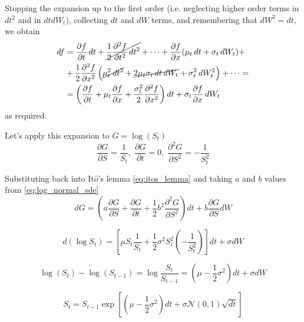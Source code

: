 \documentclass[12pt,a4paper]{article}
\begin{document}
Stopping the expansion up to the first order (i.e. neglecting higher order terms in $dt^2$ and in $dt dW_t$), collecting $dt$ and $dW$ terms, and remembering that $dW^2=dt$, we obtain
\begin{equation*}
\begin{aligned}
df&={\frac {\partial f}{\partial t}}\,dt+\cancel{{\frac {1}{2}}{\frac {\partial ^{2}f}{\partial t^{2}}}\,dt^{2}}+\cdots +{\frac {\partial f}{\partial x}}(\mu _{t}\,dt+\sigma _{t}\,dW_{t})+\\
&+{\frac {1}{2}}{\frac {\partial ^{2}f}{\partial x^{2}}}\left(\cancel{\mu _{t}^{2}\,dt^{2}}+\cancel{2\mu _{t}\sigma _{t}\,dt\,dW_{t}}+\sigma _{t}^{2}\,dW_{t}^{2}\right)+\cdots =\\
&=\left({\frac {\partial f}{\partial t}}+\mu _{t}{\frac {\partial f}{\partial x}}+{\frac {\sigma _{t}^{2}}{2}}{\frac {\partial ^{2}f}{\partial x^{2}}}\right)dt+\sigma _{t}{\frac {\partial f}{\partial x}}\,dW_{t}
\end{aligned}
\end{equation*}
as required.

Let's apply this expansion to $G=\log(S_t)$ 
\begin{equation*}
\frac{\partial G}{\partial S}=\frac{1}{S_t},\;\frac{\partial G}{\partial t}=0,\;\frac{\partial^2 G}{\partial S^2}=-\frac{1}{S_t^2}
\end{equation*}

Substituting back into It$\hat{o}$'s lemma \ref{eq:itos_lemma} and taking $a$ and $b$ values from \ref{eq:log_normal_sde}
\begin{equation*}
dG = \left(a\frac{\partial G}{\partial S} + \frac{\partial G}{\partial t} + \frac{1}{2}b^2\frac{\partial^2 G}{\partial S^2}\right)dt + b\frac{\partial G}{\partial S} dW
\end{equation*}

\begin{equation*}
d(\log S_t) = \left[\mu S_t\frac{1}{S_t} + \frac{1}{2}\sigma^2S_t^2\left(-\frac{1}{S_t^2}\right)\right]dt + \sigma dW
\end{equation*}

\begin{equation*}
\log(S_t) - \log(S_{t-1}) = \log\frac{S_t}{S_{t-1}}=\left(\mu - \frac{1}{2}\sigma^2\right)dt + \sigma dW 
\end{equation*}	

\begin{equation}
S_t = S_{t-1}\exp\left[\left(\mu-\frac{1}{2}\sigma^2\right)dt + \sigma\mathcal{N}(0,1)\sqrt{dt}\right] 
\label{eq:lognormal_solution}
\end{equation}
	
\end{document}

